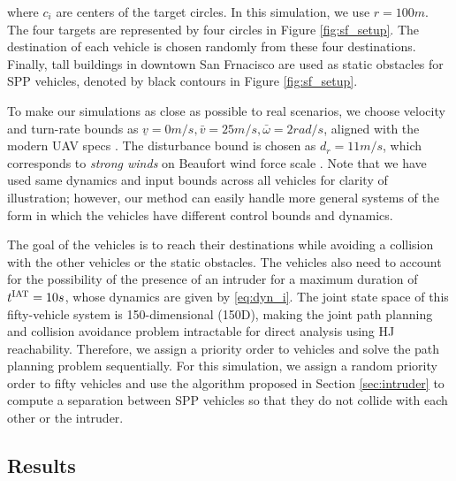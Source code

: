 \noindent where $c_i$ are centers of the target circles. In this simulation, we use $r = 100m$. %
The four targets are represented by four circles in Figure \ref{fig:sf_setup}. The destination of each vehicle is chosen randomly from these four destinations. Finally, tall buildings in downtown San Frnacisco are used as static obstacles for SPP vehicles, denoted by black contours in Figure \ref{fig:sf_setup}.

To make our simulations as close as possible to real scenarios, we choose velocity and turn-rate bounds as $\underline{v} = 0m/s, \bar{v} = 25m/s, \bar\omega = 2 rad/s$, aligned with the modern UAV specs \cite{UAVspecs1, UAVspecs2}. The disturbance bound is chosen as $d_{r} = 11 m/s$, which corresponds to \textit{strong winds} on Beaufort wind force scale \cite{Windscale}. Note that we have used same dynamics and input bounds across all vehicles for clarity of illustration; however, our method can easily handle more general systems of the form in which the vehicles have different control bounds and dynamics.

The goal of the vehicles is to reach their destinations while avoiding a collision with the other vehicles or the static obstacles. The vehicles also need to account for the possibility of the presence of an intruder for a maximum duration of $t^\text{IAT} = 10s$, whose dynamics are given by \eqref{eq:dyn_i}. The joint state space of this fifty-vehicle system is 150-dimensional (150D), making the joint path planning and collision avoidance problem intractable for direct analysis using HJ reachability. Therefore, we assign a priority order to vehicles and solve the path planning problem sequentially. For this simulation, we assign a random priority order to fifty vehicles and use the algorithm proposed in Section \ref{sec:intruder} to compute a separation between SPP vehicles so that they do not collide with each other or the intruder. 

\subsection{Results \label{sec:simResults}}


